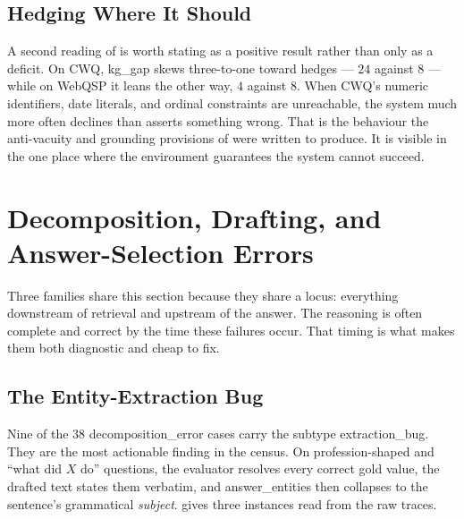 \subsection{Hedging Where It Should}

A second reading of  is worth stating as a positive
result rather than only as a deficit. On CWQ, \textsf{kg\_gap}
skews three-to-one toward hedges --- $24$ against $8$ --- while on WebQSP it
leans the other way, $4$ against $8$. When CWQ's numeric identifiers, date
literals, and ordinal constraints are unreachable, the system much more often
declines than asserts something wrong. That is the behaviour the anti-vacuity
and grounding provisions of  were written to
produce. It is visible in the one place where the environment guarantees the
system cannot succeed.

\section{Decomposition, Drafting, and Answer-Selection
Errors}\label{sec:decomposition-errors}

Three families share this section because they share a locus: everything
downstream of retrieval and upstream of the answer. The reasoning is often
complete and correct by the time these failures occur. That timing is what
makes them both diagnostic and cheap to fix.

\subsection{The Entity-Extraction Bug}

Nine of the $38$ \textsf{decomposition\_error} cases carry the subtype
\textsf{extraction\_bug}. They are the most actionable finding in the
census. On profession-shaped and ``what did $X$ do'' questions, the evaluator
resolves every correct gold value, the drafted text states them verbatim, and
\textsf{answer\_entities} then collapses to the sentence's grammatical
\emph{subject}.  gives three instances read from the raw
traces.

